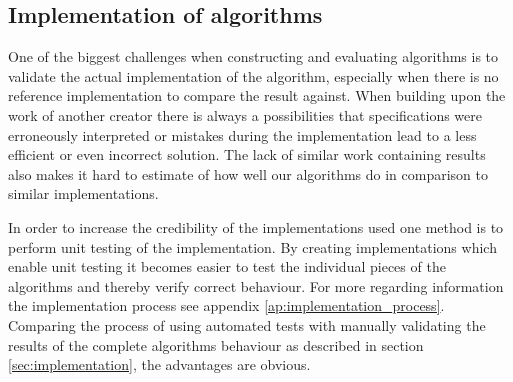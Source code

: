 \subsection{Implementation of algorithms}

One of the biggest challenges when constructing and evaluating algorithms is to
validate the actual implementation of the algorithm, especially when there is
no reference implementation to compare the result against. When building upon
the work of another creator there is always a possibilities that specifications
were erroneously interpreted or mistakes during the implementation lead to a less
efficient or even incorrect solution. The lack of similar work containing results
also makes it hard to estimate of how well our algorithms do in
comparison to similar implementations.

In order to increase the credibility of the implementations used one method is
to perform unit testing of the implementation. By creating implementations
which enable unit testing it becomes easier to test the individual pieces of
the algorithms and thereby verify correct behaviour. For more regarding
information the implementation process see appendix
\ref{ap:implementation_process}. Comparing the process of using automated tests
with manually validating the results of the complete algorithms behaviour as
described in section \ref{sec:implementation}, the advantages are obvious.
